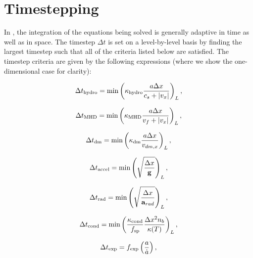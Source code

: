 \section{Timestepping}
\label{sec.timestepping}

In \enzo, the integration of the equations being solved is generally adaptive in time 
as well as in space.  The timestep $\Delta t$ is set on a level-by-level
basis by finding the largest timestep such that all of the criteria listed below are
satisfied.  The timestep criteria are given by the following expressions
(where we show the one-dimensional case for clarity):

\begin{equation}
\Delta t_{\rm hydro} = \min \left( \kappa_{\rm hydro} \frac{a \Delta x}{c_{s} + |v_x|} \right)_L ,
\label{eqn:dthydro}
\end{equation}

\begin{equation}
\Delta t_{\rm MHD} = \min \left( \kappa_{\rm MHD} \frac{a \Delta x}{v_{f} + |v_x|} \right)_L ,
\label{eqn:dtMHD}
\end{equation}

\begin{equation}
\Delta t_{\rm dm} = \min \left(\kappa_{\rm dm} \frac{a \Delta x}{v_{dm,x}} \right)_L ,
\label{eqn:dtdarkmatter}
\end{equation}

\begin{equation}
\Delta t_{\rm accel} = \min \left( \sqrt{\frac{\Delta x}{\myvec{g}}} \right)_L ,
\label{eqn:dtaccel}
\end{equation}

\begin{equation}
\Delta t_{\rm rad} = \min \left(  \sqrt{\frac{\Delta x}{\myvec{a}_{rad}}} \right)_L,
\label{eqn:dtrad}
\end{equation}

\begin{equation}
\Delta t_{\rm cond} = \min \left(  \frac{ \kappa_{\rm cond}}{f_{\rm sp}} \frac{\Delta x^2
    n_b}{\kappa(T)} \right)_L,
\label{eqn:dtcond}
\end{equation}

\begin{equation}
\Delta t_{\rm exp} = f_{\rm exp} \left( \frac{a}{\dot{a}} \right) ,
\label{eqn:dtexpand}
\end{equation}


